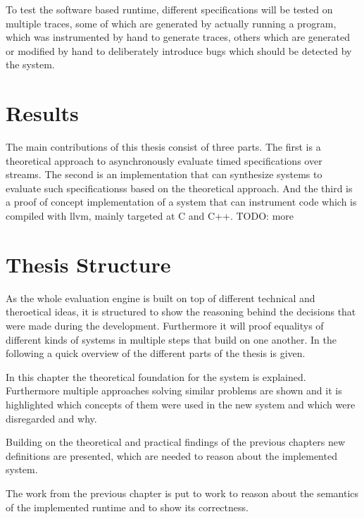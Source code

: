 To test the software based runtime, different specifications will be tested on multiple traces, some of which are generated by actually running a program,
which was instrumented by hand to generate traces, others which are generated or modified by hand to deliberately introduce bugs which should be detected by the system.

\section{Results}
\label{sec:intro:results}

The main contributions of this thesis consist of three parts.
The first is a theoretical approach to asynchronously evaluate timed specifications over streams.
The second is an implementation that can synthesize systems to evaluate such specificationss based on the theoretical approach.
And the third is a proof of concept implementation of a system that can instrument code which is compiled with \gls{llvm}, mainly targeted at C and C++.
TODO: more


\section{Thesis Structure}
\label{sec:intro:structure}

As the whole evaluation engine is built on top of different technical and theroetical ideas, it is structured to show
the reasoning behind the decisions that were made during the development.
Furthermore it will proof equalitys of different kinds of systems in multiple steps that build on one another.
In the following a quick overview of the different parts of the thesis is given.

\textbf{}

In this chapter the theoretical foundation for the system is explained.
Furthermore multiple approaches solving similar problems are shown and it is highlighted which concepts of them were
used in the new system and which were disregarded and why.


\textbf{}

Building on the theoretical and practical findings of the previous chapters new definitions are presented, which are needed to reason about the implemented system.

\textbf{}

The work from the previous chapter is put to work to reason about the semantics of the implemented runtime and to show its correctness.

